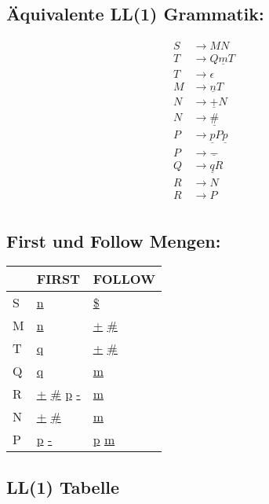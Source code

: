 \documentclass[12pt,runningheads,a4paper]{llncs}
\begin{document}
\subsection*{\"Aquivalente LL(1) Grammatik:}
\begin{align*}
S &\rightarrow MN \\
T &\rightarrow  Q\underline{m}T \\
T &\rightarrow \epsilon \\
M &\rightarrow \underline{n} T \\
N &\rightarrow \underline{+} N \\
N &\rightarrow \underline{\#} \\
P &\rightarrow \underline{p} P \underline{p} \\
P &\rightarrow \underline{-} \\
Q &\rightarrow \underline{q} R \\
R &\rightarrow N \\
R &\rightarrow P \\
\end{align*}


\subsection*{First und Follow Mengen:}

\begin{table}[htbp]
    \centering
      \begin{tabular}{|m{1cm}|m{2cm}|m{2cm}|}
\hline
 &FIRST & FOLLOW \\ \hline
S&\underline{n}&\underline{\$}\\ \hline
M&\underline{n}&\underline{+} \underline{\#}\\ \hline
T&\underline{q}&\underline{+} \underline{\#}\\ \hline
Q&\underline{q}&\underline{m}\\ \hline
R&\underline{+} \underline{\#} \underline{p} \underline{-} & \underline{m}\\ \hline
N&\underline{+} \underline{\#}&\underline{m}\\ \hline
P&\underline{p} \underline{-}&\underline{p} \underline{m}\\ 
\hline
        \end{tabular}
\end{table}

\subsection*{LL(1) Tabelle}
\end{document}
